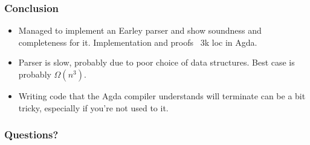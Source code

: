\begin{frame}
	\frametitle{Conclusion}
	\begin{itemize}

		\item
			
			Managed to implement an Earley parser and show soundness and
			completeness for it. Implementation and proofs ~3k loc in Agda.
		
		\item

			Parser is slow, probably due to poor choice of data structures.
			Best case is probably $\Omega(n^3)$.
		
		\item

			Writing code that the Agda compiler understands will terminate can 
			be a bit tricky, especially if you're not used to it.

	\end{itemize}
\end{frame}

\begin{frame}
	\frametitle{Questions?}
\end{frame}
